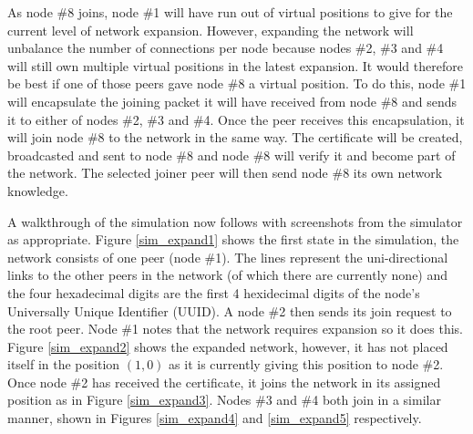 \documentclass[ %
                    author={Luke Murray},
                supervisor={Dr. Simon Hollis},
                     title={Shadow Peer-to-Peer Networks},
                  subtitle={},
                    degree={MEng},
                      year={2013} ]{thesis}
\begin{document}
As node \#8 joins, node \#1 will have run out of virtual positions to give for the current level of network expansion. However, expanding the network will unbalance the number of connections per node because nodes \#2, \#3 and \#4 will still own multiple virtual positions in the latest expansion. It would therefore be best if one of those peers gave node \#8 a virtual position. To do this, node \#1 will encapsulate the joining packet it will have received from node \#8 and sends it to either of nodes \#2, \#3 and \#4. Once the peer receives this encapsulation, it will join node \#8 to the network in the same way. The certificate will be created, broadcasted and sent to node \#8 and node \#8 will verify it and become part of the network. The selected joiner peer will then send node \#8 its own network knowledge.

A walkthrough of the simulation now follows with screenshots from the simulator as appropriate. Figure \ref{sim_expand1} shows the first state in the simulation, the network consists of one peer (node \#1). The lines represent the uni-directional links to the other peers in the network (of which there are currently none) and the four hexadecimal digits are the first 4 hexidecimal digits of the node's Universally Unique Identifier (UUID). A node \#2 then sends its join request to the root peer. Node \#1 notes that the network requires expansion so it does this. Figure \ref{sim_expand2} shows the expanded network, however, it has not placed itself in the position $(1,0)$ as it is currently giving this position to node \#2. Once node \#2 has received the certificate, it joins the network in its assigned position as in Figure \ref{sim_expand3}. Nodes \#3 and \#4 both join in a similar manner, shown in Figures \ref{sim_expand4} and \ref{sim_expand5} respectively.
\end{document}
